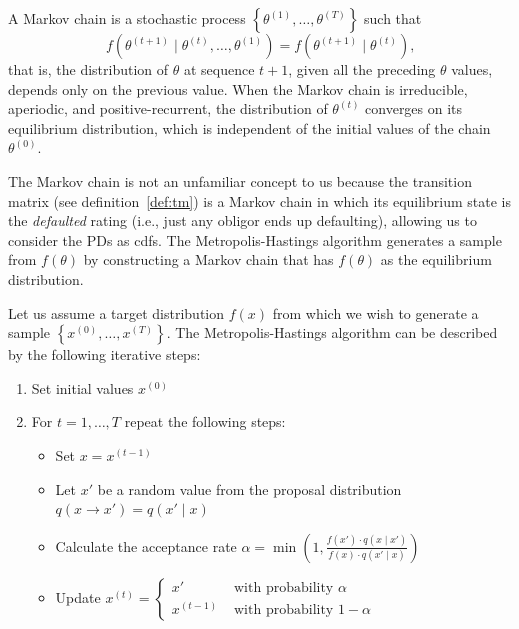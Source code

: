 \documentclass[11pt,fleqn]{book} %
\begin{document}
\begin{definition}
	A Markov chain is a stochastic process 
	$\left\{\theta^{(1)},\dots,\theta^{(T)}\right\}$ such that
	\begin{displaymath}
		f\left(\theta^{(t+1)} \mid \theta^{(t)},\dots,\theta^{(1)}\right) = 
		f\left(\theta^{(t+1)} \mid \theta^{(t)}\right)
		\text{,}
	\end{displaymath}
	that is, the distribution of $\theta$ at sequence $t+1$, given all the 
	preceding $\theta$ values, depends only on the previous value. 
	When the Markov chain is irreducible, aperiodic, and positive-recurrent, 
	the distribution of $\theta^{(t)}$ converges on its equilibrium 
	distribution, which is independent of the initial values of the chain 
	$\theta^{(0)}$.
\end{definition}

The Markov chain is not an unfamiliar concept to us because the transition 
matrix (see definition~\ref{def:tm}) is a Markov chain in which its 
equilibrium state is the \emph{defaulted} rating (i.e., just any 
obligor ends up defaulting), allowing us to consider the PDs as cdfs.
The Metropolis-Hastings algorithm generates a sample from $f(\theta)$ 
by constructing a Markov chain that has $f(\theta)$ as the equilibrium 
distribution.

\begin{algorithm}
	Let us assume a target distribution $f(x)$ from which we wish to 
	generate a sample $\left\{x^{(0)},\dots,x^{(T)}\right\}$. The 
	Metropolis-Hastings algorithm can be described by the following 
	iterative steps:
	\begin{enumerate}
		\item Set initial values $x^{(0)}$
		\item For $t=1,\dots,T$ repeat the following steps:
		\begin{itemize}
			\item Set $x=x^{(t-1)}$
			\item Let $x'$ be a random value from the proposal distribution 
			$q(x \to x')=q(x' \mid x)$
			\item Calculate the acceptance rate 
			$\alpha = \min\left(1,\frac{f(x') \cdot q(x \mid x')}{f(x) \cdot q(x' \mid x)}\right)$
			\item Update $x^{(t)}=\left\{
			\begin{array}{ll}
				x'        & \text{ with probability } \alpha   \\
				x^{(t-1)} & \text{ with probability } 1-\alpha 
			\end{array}\right.$ 
		\end{itemize}
	\end{enumerate}
\end{algorithm}
\end{document}
